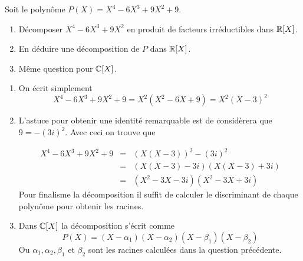 \documentclass{report}
\begin{document}
\qs{}
{

Soit le polynôme $P(X) = X^4-6X^3+9X^2+9$.

\begin{enumerate}
  \item Décomposer $X^4-6X^3+9X^2$ en produit de facteurs irréductibles dans
    $\mathbb{R}[X]$.
  \item En déduire une décomposition de $P$ dans $\mathbb{R}[X]$.

  \item Même question pour $\mathbb{C}[X]$.
\end{enumerate}

}
\begin{myproof}
  \begin{enumerate}
\item
  On écrit simplement
  $$
  X^4 - 6X^3 + 9X^2 + 9 = X^2(X^2-6X+9) = X^2 (X-3)^2
  $$

\item L'astuce pour obtenir une identité remarquable est de considèrera que $9 = -(3i)^2$. Avec ceci on trouve que 

  \begin{eqnarray*}
    X^4-6X^3+9X^2 + 9 &=& \left(X(X-3)\right)^2 - (3i)^2\\
                      &=& (X(X-3) - 3i)(X(X-3) + 3i)\\
                      &=& (X^2 - 3X -3i)(X^2-3X+3i)
  \end{eqnarray*}
  Pour finalisme la décomposition il suffit de calculer le discriminant de chaque polynôme pour obtenir les racines.
\item  Dans $\mathbb{C}[X]$ la décomposition s'écrit comme
  $$
  P(X) = (X-\alpha_1)(X-\alpha_2)(X - \beta_1)(X- \beta_2)
  $$
  Ou $\alpha_1, \alpha_2, \beta_1$ et $\beta_2$ sont les racines calculées dans la question précédente.
\end{enumerate}
\end{myproof}
\end{document}
